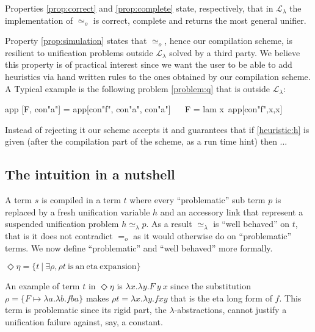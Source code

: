 \documentclass[sigconf,natbib=false,review]{acmart}
\newcommand{\EqualRel}{\ensuremath{=}}
\newcommand{\UnifRel}{\ensuremath{\simeq}}
\newcommand{\Uo}{\ensuremath{\UnifRel_o}\xspace}
\newcommand{\Eo}{\ensuremath{\EqualRel_o}\xspace}
\newcommand{\Ue}{\ensuremath{\UnifRel_\lambda}\xspace}
\newcommand{\llambda}{\ensuremath{\mathcal{L}_\lambda}\xspace}
\begin{document}
Properties \ref{prop:correct} and \ref{prop:complete} state, respectively, that
in \llambda the implementation of \Uo is correct, complete and returns the most
general unifier.

Property \ref{prop:simulation} states that \Uo, hence our compilation scheme,
is resilient to unification problems outside \llambda solved by
a third party. We believe this property is of practical interest since we
want the user to be able to add heuristics via hand written rules
to the ones obtained by our compilation scheme. A Typical example
is the following problem \ref{problem:q} that is outside \llambda:

\begin{elpicode}
app [F, con"a"] = app[con"f", con"a", con"a"]          ~~
F = lam x\ app[con"f",x,x]                             ~~
\end{elpicode}

\noindent
Instead of rejecting it our scheme accepts it and guarantees that if
\ref{heuristic:h} is given (after the compilation part of the scheme, as
a run time hint) then ...


\subsection{The intuition in a nutshell}
\label{sec:nutshell}
A term $s$ is compiled in a term $t$ where every
``problematic'' sub term $p$ is replaced by a fresh unification variable $h$
and an accessory link that represent a suspended unification problem
$h \Ue p$. As a result \Ue is ``well behaved'' on $t$, that is it does not
contradict \Eo as it would otherwise do on ``problematic'' terms.
We now define ``problematic'' and ``well behaved'' more formally.

\newcommand{\maybeeta}{\ensuremath{\Diamond\eta}\xspace}
\newcommand{\maybebeta}{\ensuremath{\Diamond\beta}\xspace}
\begin{definition}[\maybeeta]
  $\maybeeta = \{ t ~|~ \exists \rho, \rho t ~\mathrm{is~an~eta~expansion} \}$
\end{definition}

\noindent
An example of term $t$ in \maybeeta{} is
$\lambda x.\lambda y.F~y~x$
since the substitution
$\rho = \{ F \mapsto \lambda a.\lambda b.fba\}$
makes $\rho t = \lambda x.\lambda y.f x y$
that is the eta long form of $f$. This term is problematic since
its rigid part, the $\lambda$-abstractions, cannot justify a
unification failure against, say, a constant.
\end{document}
